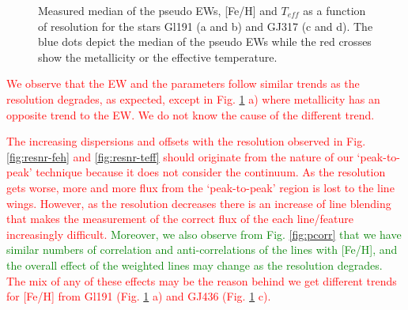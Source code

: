 \documentclass{aa}
\begin{document}
\begin{figure}[]
\caption{Measured median of the pseudo EWs, [Fe/H] and $T_{eff}$ as a function of resolution for the stars Gl191 (a and b) and GJ317 (c and d). The blue dots depict the median of the pseudo EWs while the red crosses show the metallicity or the effective temperature.}
\label{fig:ewres}
\end{figure}

\textcolor{red}{We observe that the EW and the parameters follow similar trends as the resolution degrades, as expected, except in Fig. \ref{fig:ewres} a) where metallicity has an opposite trend to the EW. We do not know the cause of the different trend.}

\textcolor{red}{The increasing dispersions and offsets with the resolution observed in Fig. \ref{fig:resnr-feh} and \ref{fig:resnr-teff} should originate from the nature of our `peak-to-peak' technique because it does not consider the continuum. As the resolution gets worse, more and more flux from the `peak-to-peak' region is lost to the line wings. However, as the resolution decreases there is an increase of line blending that makes the measurement of the correct flux of the each line/feature increasingly difficult. \textcolor{green}{Moreover, we also observe from Fig. \ref{fig:pcorr} that we have similar numbers of correlation and anti-correlations of the lines with [Fe/H], and the overall effect of the weighted lines may change as the resolution degrades.} The mix of any of these effects may be the reason behind we get different trends for [Fe/H] from Gl191 (Fig. \ref{fig:ewres} a) and GJ436 (Fig. \ref{fig:ewres} c).}


\end{document}
